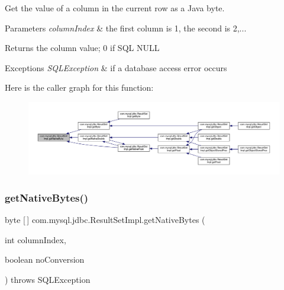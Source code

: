Get the value of a column in the current row as a Java byte.


\begin{DoxyParams}{Parameters}
{\em column\+Index} & the first column is 1, the second is 2,...\\
\hline
\end{DoxyParams}
\begin{DoxyReturn}{Returns}
the column value; 0 if S\+QL N\+U\+LL
\end{DoxyReturn}

\begin{DoxyExceptions}{Exceptions}
{\em S\+Q\+L\+Exception} & if a database access error occurs \\
\hline
\end{DoxyExceptions}
Here is the caller graph for this function\+:
\nopagebreak
\begin{figure}[H]
\begin{center}
\leavevmode
\includegraphics[width=350pt]{classcom_1_1mysql_1_1jdbc_1_1_result_set_impl_a7b543fcc945651d4e6722a3048c22e94_icgraph}
\end{center}
\end{figure}
\mbox{\label{classcom_1_1mysql_1_1jdbc_1_1_result_set_impl_abd4834b44508518bbd8c292a951772d5}} 
\subsubsection{\texorpdfstring{get\+Native\+Bytes()}{getNativeBytes()}}
{\footnotesize\ttfamily byte \mbox{[}$\,$\mbox{]} com.\+mysql.\+jdbc.\+Result\+Set\+Impl.\+get\+Native\+Bytes (\begin{DoxyParamCaption}\item[{int}]{column\+Index,  }\item[{boolean}]{no\+Conversion }\end{DoxyParamCaption}) throws S\+Q\+L\+Exception\hspace{0.3cm}{\ttfamily [protected]}}

